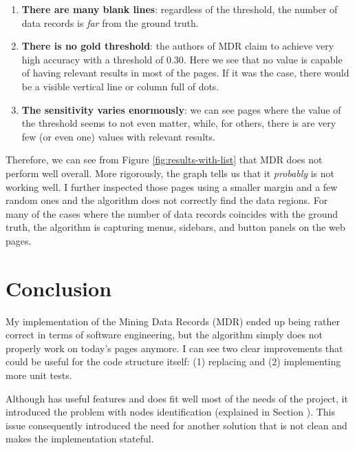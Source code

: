 \documentclass[10pt]{article}
\begin{document}
\begin{enumerate}
    
    \item \textbf{There are many blank lines}: regardless of the threshold, the number of data records is \emph{far} from the ground truth.
    
    \item \textbf{There is no gold threshold}: the authors of MDR claim to achieve very high accuracy with a threshold of $0.30$. Here we see that no value is capable of having relevant results in most of the pages. If it was the case, there would be a visible vertical line or column full of dots.
    
    \item \textbf{The sensitivity varies enormously}: we can see pages where the value of the threshold seems to not even matter, while, for others, there is are very few (or even one) values with relevant results. 
    
\end{enumerate}

Therefore, we can see from Figure \ref{fig:results-with-list} that MDR does not perform well overall. More rigorously, the graph tells us that it \emph{probably} is not working well. I further inspected those pages using a smaller margin and a few random ones and the algorithm does not correctly find the data regions. For many of the cases where the number of data records coincides with the ground truth, the algorithm is capturing menus, sidebars, and button panels on the web pages.



\section{Conclusion}

My implementation of the Mining Data Records (MDR) ended up being rather correct in terms of software engineering, but the algorithm simply does not properly work on today's pages anymore. I can see two clear improvements that could be useful for the code structure itself: (1) replacing  and (2) implementing more unit tests. 

Although  has useful features and does fit well most of the needs of the project, it introduced the problem with nodes identification (explained in Section ). This issue consequently introduced the need for another solution that is not clean and makes the implementation stateful.
\end{document}
